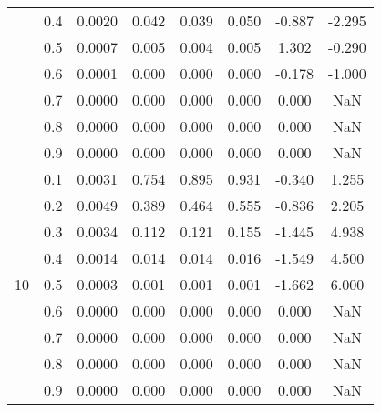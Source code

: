 \documentclass[11pt,a4paper]{report}
\begin{document}
\begin{longtable}{ | c | c || c | c | c | c | c | c | }
 & 0.4 & 0.0020 & 0.042 & 0.039 & 0.050 & -0.887 & -2.295 \\
 & 0.5 & 0.0007 & 0.005 & 0.004 & 0.005 & 1.302 & -0.290 \\
 & 0.6 & 0.0001 & 0.000 & 0.000 & 0.000 & -0.178 & -1.000 \\
 & 0.7 & 0.0000 & 0.000 & 0.000 & 0.000 & 0.000 & NaN \\
 & 0.8 & 0.0000 & 0.000 & 0.000 & 0.000 & 0.000 & NaN \\
 & 0.9 & 0.0000 & 0.000 & 0.000 & 0.000 & 0.000 & NaN \\
 \hline
\multirow{9}{*}{10} & 0.1 & 0.0031 & 0.754 & 0.895 & 0.931 & -0.340 & 1.255 \\
 & 0.2 & 0.0049 & 0.389 & 0.464 & 0.555 & -0.836 & 2.205 \\
 & 0.3 & 0.0034 & 0.112 & 0.121 & 0.155 & -1.445 & 4.938 \\
 & 0.4 & 0.0014 & 0.014 & 0.014 & 0.016 & -1.549 & 4.500 \\
 & 0.5 & 0.0003 & 0.001 & 0.001 & 0.001 & -1.662 & 6.000 \\
 & 0.6 & 0.0000 & 0.000 & 0.000 & 0.000 & 0.000 & NaN \\
 & 0.7 & 0.0000 & 0.000 & 0.000 & 0.000 & 0.000 & NaN \\
 & 0.8 & 0.0000 & 0.000 & 0.000 & 0.000 & 0.000 & NaN \\
 & 0.9 & 0.0000 & 0.000 & 0.000 & 0.000 & 0.000 & NaN \\
 \hline
\hline
\end{longtable}
\end{document}
